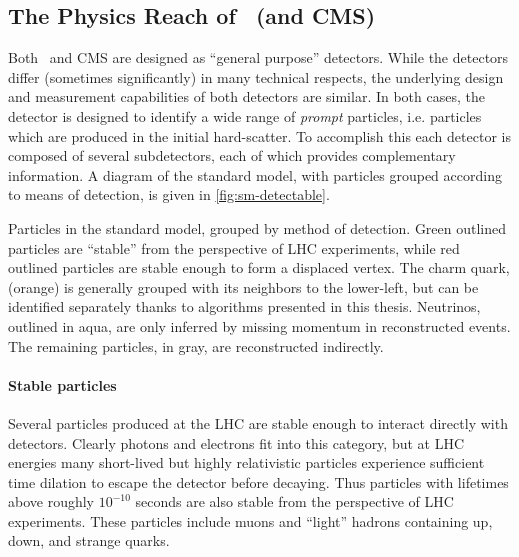 
\subsection{The Physics Reach of \atlas\ (and CMS)}
Both \atlas\ and CMS are designed as ``general purpose'' detectors.
While the detectors differ (sometimes significantly) in many technical respects, the underlying design and measurement capabilities of both detectors are similar.
In both cases, the detector is designed to identify a wide range of \emph{prompt} particles, i.e. particles which are produced in the initial hard-scatter.
To accomplish this each detector is composed of several subdetectors, each of which provides complementary information.
A diagram of the standard model, with particles grouped according to means of detection, is given in \cref{fig:sm-detectable}.

\begin{cfig}
  \caption[Particles in the standard model grouped by detection method]{
    Particles in the standard model, grouped by method of detection.
    Green outlined particles are ``stable'' from the perspective of LHC experiments, while red outlined particles are stable enough to form a displaced vertex.
    The charm quark, (orange) is generally grouped with its neighbors to the lower-left, but can be identified separately thanks to algorithms presented in this thesis.
    Neutrinos, outlined in aqua, are only inferred by missing momentum in reconstructed events.
    The remaining particles, in gray, are reconstructed indirectly.
  }
  \label{fig:sm-detectable}
\end{cfig}

\paragraph{Stable particles} Several particles produced at the LHC are stable enough to interact directly with detectors.
Clearly photons and electrons fit into this category, but at LHC energies many short-lived but highly relativistic particles experience sufficient time dilation to escape the detector before decaying.
Thus particles with lifetimes above roughly $10^{-10}$ seconds are also stable from the perspective of LHC experiments.
These particles include muons and ``light'' hadrons containing up, down, and strange quarks.

